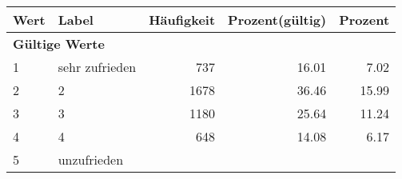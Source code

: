      \begin{longtable}{lXrrr}
     \toprule
     \textbf{Wert} & \textbf{Label} & \textbf{Häufigkeit} & \textbf{Prozent(gültig)} & \textbf{Prozent} \\
     \endhead
     \midrule
     \multicolumn{5}{l}{\textbf{Gültige Werte}}\\

     1 &
     \multicolumn{1}{X}{ sehr zufrieden   } &


       \num{737} &
       \num[round-mode=places,round-precision=2]{16,01} &
         \num[round-mode=places,round-precision=2]{7,02} \\

     2 &
     \multicolumn{1}{X}{ 2   } &


       \num{1678} &
       \num[round-mode=places,round-precision=2]{36,46} &
         \num[round-mode=places,round-precision=2]{15,99} \\

     3 &
     \multicolumn{1}{X}{ 3   } &


       \num{1180} &
       \num[round-mode=places,round-precision=2]{25,64} &
         \num[round-mode=places,round-precision=2]{11,24} \\

     4 &
     \multicolumn{1}{X}{ 4   } &


       \num{648} &
       \num[round-mode=places,round-precision=2]{14,08} &
         \num[round-mode=places,round-precision=2]{6,17} \\

     5 &
     \multicolumn{1}{X}{ unzufrieden   } &



\end{longtable}
